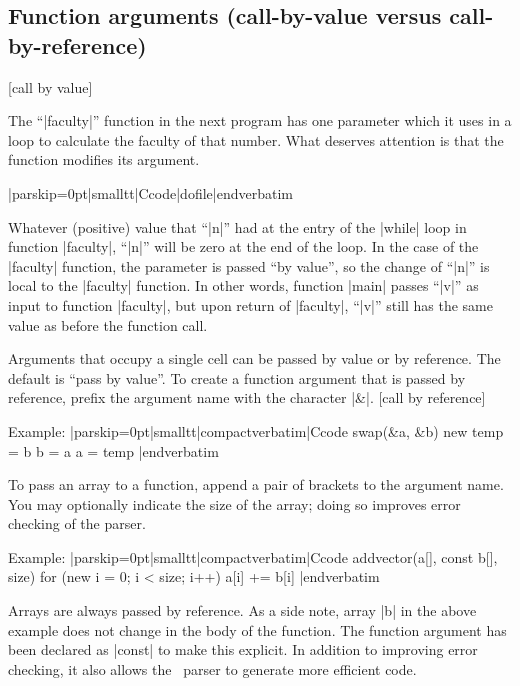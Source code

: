\subsection{Function arguments (call-by-value versus call-by-reference)}
 [call by value]

The ``|faculty|'' function in the next program has one parameter which it uses
in a loop to calculate the faculty of that number. What deserves attention is that the function
modifies its argument.

\bigskip{}
\verbatim|parskip=0pt|smalltt|Ccode|dofile|endverbatim\endlistingx

Whatever (positive) value that ``|n|'' had at the entry of the |while| loop
in function |faculty|, ``|n|''
will be zero at the end of the loop. In the case of the |faculty| function,
the parameter is passed ``by value'', so the change of ``|n|'' is local to the
|faculty| function. In other words, function |main| passes ``|v|'' as input
to function |faculty|, but upon return of |faculty|, ``|v|'' still has the
same value as before the function call.

Arguments that occupy a single cell can be passed by value or by reference.
The default is ``pass by value''. To create a function argument that is passed
by reference, prefix the argument name with the character |&|.
 [call by reference]

Example:
\listingx\verbatim|parskip=0pt|smalltt|compactverbatim|Ccode
swap(&a, &b)
    {
    new temp = b
    b = a
    a = temp
    }
|endverbatim\endlistingx

To pass an array to a function, append a pair of brackets to the argument
name. You may optionally indicate the size of the array; doing so improves
error checking of the parser.

Example:
\listingx\verbatim|parskip=0pt|smalltt|compactverbatim|Ccode
addvector(a[], const b[], size)
    {
    for (new i = 0; i < size; i++)
        a[i] += b[i]
    }
|endverbatim\endlistingx

\noindent{}%
Arrays are always passed by reference. As a side note, array |b| in the above
example does not change in the body of the function. The function argument has
been declared as |const| to make this explicit. In addition to improving error
checking, it also allows the \Small\ parser to generate more efficient code.


